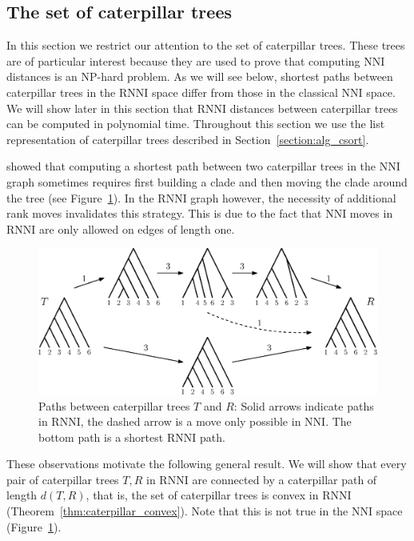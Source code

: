 \documentclass{amsart}
\newcommand{\nni}{\mathrm{NNI}}
\newcommand{\rnni}{\mathrm{RNNI}}
\begin{document}
\subsection{The set of caterpillar trees}
\label{section:caterpillar_convex}

In this section we restrict our attention to the set of caterpillar trees.
These trees are of particular interest because they are used to prove that computing $\nni$ distances is an NP-hard problem.
As we will see below, shortest paths between caterpillar trees in the $\rnni$ space differ from those in the classical $\nni$ space.
We will show later in this section that $\rnni$ distances between caterpillar trees can be computed in polynomial time.
Throughout this section we use the list representation of caterpillar trees described in Section~\ref{section:alg_csort}.

\textcite{Gavryushkin2018-ol} showed that computing a shortest path between two caterpillar trees in the $\nni$ graph sometimes requires first building a clade and then moving the clade around the tree (see Figure~\ref{fig:NNI_vs_RNNI}).
In the $\rnni$ graph however, the necessity of additional rank moves invalidates this strategy.
This is due to the fact that $\nni$ moves in $\rnni$ are only allowed on edges of length one.

\begin{figure}[H]
\centering
\includegraphics[width=\textwidth]{NNI_vs_RNNI}
\vspace{12pt}
\caption{Paths between caterpillar trees $T$ and $R$: Solid arrows indicate paths in $\rnni$, the dashed arrow is a move only possible in $\nni$.
The bottom path is a shortest $\rnni$ path.}
\label{fig:NNI_vs_RNNI}
\end{figure}

These observations motivate the following general result.
We will show that every pair of caterpillar trees $T, R$ in $\rnni$ are connected by a caterpillar path of length $d(T,R)$, that is, the set of caterpillar trees is convex in $\rnni$ (Theorem~\ref{thm:caterpillar_convex}).
Note that this is not true in the $\nni$ space (Figure~\ref{fig:NNI_vs_RNNI}).
\end{document}
